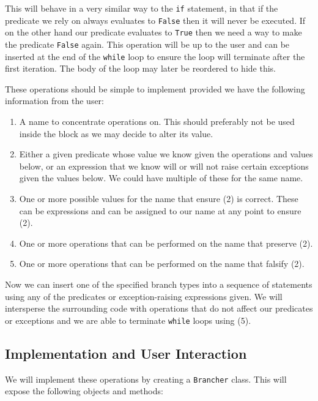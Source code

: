 \documentclass[twoside,a4paper]{report}
\begin{document}
This will behave in a very similar way to the \texttt{if} statement, in that if the predicate we rely on always evaluates to \texttt{False} then it will never
be executed. If on the other hand our predicate evaluates to \texttt{True} then we need a way to make the predicate \texttt{False} again. This operation will
be up to the user and can be inserted at the end of the \texttt{while} loop to ensure the loop will terminate after the first iteration. The body of the loop
may later be reordered to hide this.

These operations should be simple to implement provided we have the following information from the user:

\begin{enumerate}
\item A name to concentrate operations on. This should preferably not be used inside the block as we may decide to alter its value.
\item Either a given predicate whose value we know given the operations and values below, or an expression that we know will or will not raise certain exceptions
      given the values below. We could have multiple of these for the same name.
\item One or more possible values for the name that ensure (2) is correct. These can be expressions and can be assigned to our name at any point to
      ensure (2).
\item One or more operations that can be performed on the name that preserve (2).
\item One or more operations that can be performed on the name that falsify (2).
\end{enumerate}

Now we can insert one of the specified branch types into a sequence of statements using any of the predicates or exception-raising expressions given. We will
intersperse the surrounding code with operations that do not affect our predicates or exceptions and we are able to terminate \texttt{while} loops using (5).

\subsection{Implementation and User Interaction}

We will implement these operations by creating a \texttt{Brancher} class. This will expose the following objects and methods:
\end{document}
